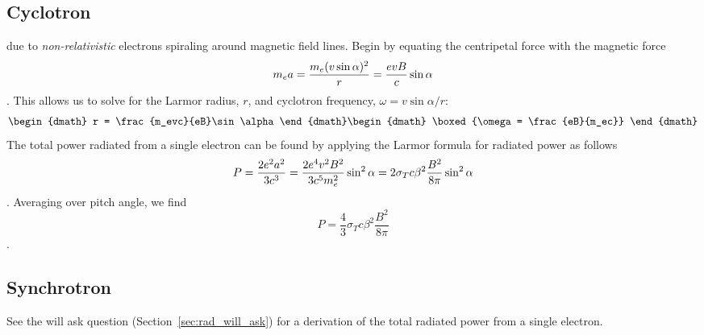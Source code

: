 \subsection{Cyclotron}
 due to \emph{non-relativistic} electrons spiraling around
magnetic field lines.  Begin by equating the centripetal force with the magnetic force
\begin{dmath*}
    m_ea = \frac{m_e (v\sin\alpha)^2}{r} \nolinebreak = \frac{evB}{c}\sin\alpha
\end{dmath*}.
This allows us to solve for the Larmor radius, $r$, and cyclotron frequency, $\omega=v\sin\alpha/r$:
\begin{dgroup*}
\begin{dmath}
    r = \frac{m_evc}{eB}\sin\alpha
\end{dmath}
\begin{dmath}
    \boxed{\omega = \frac{eB}{m_ec}}
\end{dmath}
\end{dgroup*}
The total power radiated from a single electron can be found by applying the Larmor formula
for radiated power as follows
\begin{dmath*}
    P = \frac{2e^2a^2}{3c^3} \nolinebreak = \frac{2e^4v^2B^2}{3c^5m_e^2} \sin^2\alpha \nolinebreak
      = 2\sigma_Tc\beta^2\frac{B^2}{8\pi}\sin^2\alpha
\end{dmath*}.
Averaging over pitch angle, we find
\begin{dmath*}\boxed{
    P = \frac{4}{3}\sigma_Tc\beta^2\frac{B^2}{8\pi}
}\end{dmath*}.

\subsection{Synchrotron}
See the will ask question (Section~\ref{sec:rad_will_ask})
for a derivation of the total radiated power from a single electron.  

